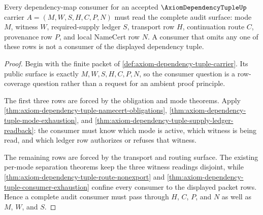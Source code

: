 \begin{theorem}
\label{thm:axiom-dependency-tuple-audit-consumer-completeness}
Every dependency-map consumer for an accepted $\AxiomDependencyTupleUp$ carrier
$A=(M,W,S,H,C,P,N)$ must read the complete audit surface: mode $M$, witness
$W$, required-supply ledger $S$, transport row $H$, continuation route $C$,
provenance row $P$, and local NameCert row $N$. A consumer that omits any one
of these rows is not a consumer of the displayed dependency tuple.
\end{theorem}
\begin{proof}
Begin with the finite packet of
\autoref{def:axiom-dependency-tuple-carrier}. Its public surface is exactly
$M,W,S,H,C,P,N$, so the consumer question is a row-coverage question rather
than a request for an ambient proof principle.

The first three rows are forced by the obligation and mode theorems. Apply
\autoref{thm:axiom-dependency-tuple-namecert-obligations},
\autoref{thm:axiom-dependency-tuple-mode-exhaustion}, and
\autoref{thm:axiom-dependency-tuple-supply-ledger-readback}: the consumer must
know which mode is active, which witness is being read, and which ledger row
authorizes or refuses that witness.

The remaining rows are forced by the transport and routing surface. The
existing per-mode separation theorems keep the three witness readings disjoint,
while \autoref{thm:axiom-dependency-tuple-route-nonexport} and
\autoref{thm:axiom-dependency-tuple-consumer-exhaustion} confine every consumer
to the displayed packet rows. Hence a complete audit consumer must pass through
$H$, $C$, $P$, and $N$ as well as $M$, $W$, and $S$.
\end{proof}

